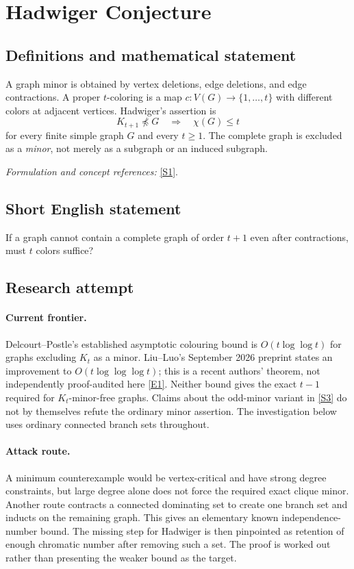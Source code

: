 \documentclass[11pt,a4paper]{article}
\numberwithin{equation}{section}
\newcommand{\sref}[2]{\hyperlink{source:#1:#2}{[S#2]}}
\newcommand{\eref}[2]{\hyperlink{extra:#1:#2}{[E#2]}}
\newif\ifshowcatalogue
\newcommand{\cataloguescope}[1]{\ifshowcatalogue
 \paragraph{Exact scope in the supplied catalogue.}
 \begin{quote}\small #1\end{quote}\fi}
\begin{document}
\setcounter{section}{0}
\section*{\texorpdfstring{Hadwiger Conjecture}{Hadwiger Conjecture}}\label{14}
\subsection{Definitions and mathematical statement}
A graph minor is obtained by vertex deletions, edge deletions, and edge contractions. A proper $t$-coloring is a map $c:V(G)\to\{1,\ldots,t\}$ with different colors at adjacent vertices. Hadwiger's assertion is
\[
 K_{t+1}\not\preccurlyeq G\quad\Longrightarrow\quad\chi(G)\le t
\]
for every finite simple graph $G$ and every $t\ge1$. The complete graph is excluded as a \emph{minor}, not merely as a subgraph or an induced subgraph.
\par\smallskip\textit{Formulation and concept references:} \sref{14}{1}.
\cataloguescope{Prove that every simple graph with no K\_\{t+1\} minor is t-colourable for every integer t >= 1.}
\subsection{Short English statement}
If a graph cannot contain a complete graph of order $t+1$ even after contractions, must $t$ colors suffice?
\subsection{Research attempt}

\paragraph{Current frontier.}
Delcourt--Postle's established asymptotic colouring bound is
$O(t\log\log t)$ for graphs excluding $K_t$ as a minor. Liu--Luo's September
2026 preprint states an improvement to $O(t\log\log\log t)$; this is a
recent authors' theorem, not independently proof-audited here
\eref{14}{1}. Neither bound gives the exact $t-1$ required for $K_t$-minor-free
graphs. Claims about the odd-minor variant in \sref{14}{3} do not by
themselves refute the ordinary minor assertion. The investigation below
uses ordinary connected branch sets throughout.

\paragraph{Attack route.}
A minimum counterexample would be vertex-critical and have strong degree
constraints, but large degree alone does not force the required exact
clique minor. Another route contracts a connected dominating set to create
one branch set and inducts on the remaining graph. This gives an elementary
known independence-number bound. The missing step for Hadwiger is then
pinpointed as retention of enough chromatic number after removing such a
set. The proof is worked out rather than presenting the weaker bound as
the target.
\end{document}
